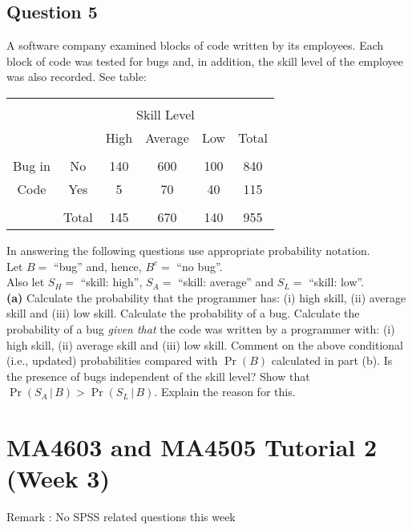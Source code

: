 
\subsection*{Question 5}
A software company examined blocks of code written by its employees. Each block of code was tested for bugs and, in addition, the skill level of the employee was also recorded. See table:
\begin{center}
	\begin{tabular}{|cc|ccc|c|}
		\hline
		&&&&&\\[-0.4cm]
		&& \multicolumn{3}{|c|}{Skill Level} &  \\
		&& High & Average & Low & Total \\
		\hline
		&&&&&\\[-0.4cm]
		Bug in   & No    &  140 &   600  & 100 & 840 \\
		Code & Yes   &    5 &    70  &  40 & 115 \\
		\hline
		&&&&&\\[-0.4cm]
		&Total &  145 &   670  & 140 & 955 \\
		\hline
	\end{tabular}
\end{center}
In answering the following questions use appropriate probability notation.\\[0.2cm]
Let $B =$ ``bug'' and, hence, $B^c =$ ``no bug''.\\[0.1cm]
Also let $S_H = $ ``skill: high'', $S_A = $ ``skill: average'' and $S_L =$ ``skill: low''.\\[-0.2cm]

{\bf(a)} Calculate the probability that the programmer has: (i) high skill, (ii) average skill and (iii) low skill.  Calculate the probability of a bug.  Calculate the probability of a bug \emph{given that} the code was written by a programmer with: (i) high skill, (ii) average skill and (iii) low skill.  Comment on the above conditional (i.e., updated) probabilities compared with $\Pr(B)$ calculated in part (b). Is the presence of bugs independent of the skill level?  Show that $\Pr(S_A\,|\,B) > \Pr(S_L\,|\,B)$. Explain the reason for this.

\newpage
\section*{MA4603 and MA4505 Tutorial 2 (Week 3)}
Remark : No SPSS related questions this week 
